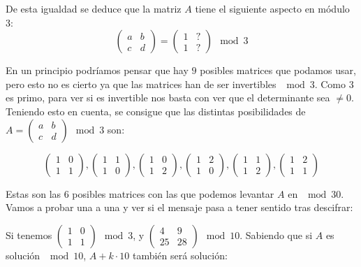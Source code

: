 \begin{problem}[5]
De esta igualdad se deduce que la matriz $A$ tiene el siguiente aspecto en módulo 3:
\[
	\left( \begin{array}{cc}
	a & b \\
	c & d
	\end{array} \right)=
	\left( \begin{array}{cc}
	1 & ? \\
	1 & ?
	\end{array} \right) \mod 3
\]

En un principio podríamos pensar que hay $9$ posibles matrices que podamos usar, pero esto no es cierto ya que las matrices han de ser invertibles $\mod 3$. Como $3$ es primo, para ver si es invertible nos basta con ver que el determinante sea $≠0$. Teniendo esto en cuenta, se consigue que las distintas posibilidades de
$A=\left( \begin{array}{cc}
	a & b \\
	c & d
	\end{array}
\right) \mod 3$ son:

\[
	\left( \begin{array}{cc}
	1 & 0 \\
	1 & 1
	\end{array} \right),
	\left( \begin{array}{cc}
	1 & 1\\
	1 & 0
	\end{array} \right),
	\left( \begin{array}{cc}
	1 & 0\\
	1 & 2
	\end{array} \right),
	\left( \begin{array}{cc}
	1 & 2\\
	1 & 0
	\end{array} \right),
	\left( \begin{array}{cc}
	1 & 1\\
	1 & 2
	\end{array} \right),
	\left( \begin{array}{cc}
	1 & 2\\
	1 & 1
	\end{array} \right)
\]

Estas son las 6 posibles matrices con las que podemos levantar $A$ en $\mod 30$. Vamos a probar una a una y ver si el mensaje pasa a tener sentido tras descifrar:

Si tenemos $\left( \begin{array}{cc}
	1 & 0 \\
	1 & 1
	\end{array} \right) \mod 3$, y $\left( \begin{array}{cc}
	4 & 9 \\
	25 & 28
	\end{array} \right) \mod 10$. Sabiendo que si $A$ es solución $\mod 10$, $A+k·10$ también será solución:


\end{problem}
